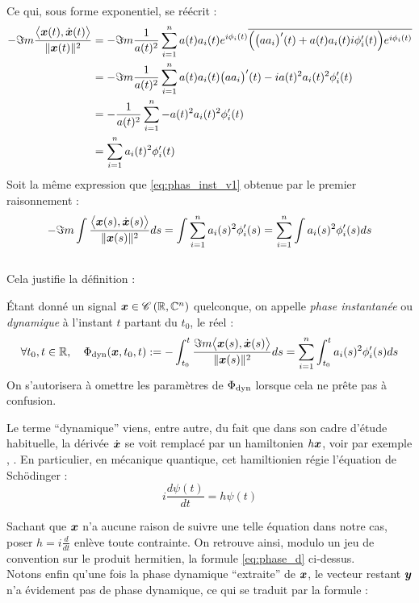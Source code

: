 \\
Ce qui, sous forme exponentiel, se réécrit :
\begin{align*}
	-\Im m\frac{\big\langle \bf{x}(t) , \dot{\bf{x}}(t) \big\rangle}{\|\bf{x}(t)\|^2} &= -\Im m\frac{1}{a(t)^2} \sum_{i=1}^n a(t)a_i(t)e^{i\phi_i(t)}\congu{\Big( \big(aa_i\big)'(t) +a(t)a_i(t)i\phi_i'(t)\Big)e^{i\phi_i(t)}} \\
	&= -\Im m\frac{1}{a(t)^2} \sum_{i=1}^n a(t)a_i(t)\big(aa_i\big)'(t) -ia(t)^2a_i(t)^2\phi_i'(t) \\
	&= -\frac{1}{a(t)^2} \sum_{i=1}^n -a(t)^2a_i(t)^2 \phi_i'(t) \\
	&= \sum_{i=1}^n a_i(t)^2 \phi_i'(t)
\end{align*}
Soit la même expression que \eqref{eq:phas_inst_v1} obtenue par le premier raisonnement :
\[-\Im m\int \frac{\big\langle \bf{x}(s) , \dot{\bf{x}}(s) \big\rangle}{\|\bf{x}(s)\|^2} ds = \int \sum_{i=1}^n a_i(s)^2 \phi_i'(s) = \sum_{i=1}^n \int a_i(s)^2 \phi_i'(s)ds\]
\\
Cela justifie la définition :

\begin{definition} \label{def:phase_d}
	\'Etant donné un signal $\bf{x}\in \conti{\R}{\C^n}$ quelconque, on appelle \emph{phase instantanée} ou \emph{dynamique} à l'instant $t$ partant du $t_0$, le réel :
	\begin{equation} \label{eq:phase_d}
		\forall t_0, t\in\R, \quad \phased(\bf{x}, t_0,t) \defeq -\int_{t_0}^t \frac{\Im m \big\langle \bf{x}(s) , \dot{\bf{x}}(s) \big\rangle}{\|\bf{x}(s)\|^2} ds =\sum_{i=1}^n \int_{t_0}^t a_i(s)^2 \phi_i'(s)ds
	\end{equation}
	On s'autorisera à omettre les paramètres de $\phased$ lorsque cela ne prête pas à confusion.
\end{definition}
\skipl

Le terme ``dynamique'' viens, entre autre, du fait que dans son cadre d'étude habituelle, la dérivée $\dot{\bf{x}}$ se voit remplacé par un hamiltonien $h\bf{x}$, voir par exemple \cite[sec. 2]{bohm_geometric_2003}, \cite[p.~215]{mukunda_quantum_1993}. En particulier, en mécanique quantique, cet hamiltionien régie l'équation de Schödinger :
\begin{equation}\label{eq:schrodinger}
	i\frac{d \psi(t)}{dt} = h\psi(t)
\end{equation}

Sachant que $\bf{x}$ n'a aucune raison de suivre une telle équation dans notre cas, poser $h = i\frac{d}{dt}$ enlève toute contrainte. On retrouve ainsi, modulo un jeu de convention sur le produit hermitien, la formule \eqref{eq:phase_d} ci-dessus.
\\ Notons enfin qu'une fois la phase dynamique ``extraite'' de $\bf{x}$, le vecteur restant $\bf{y}$ n'a évidement pas de phase dynamique, ce qui se traduit par la formule :
\\



